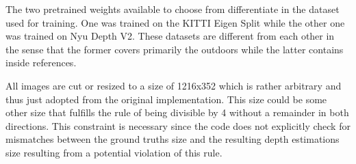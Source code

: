 The two pretrained weights available to choose from differentiate in the dataset used for training. One was trained on the KITTI Eigen Split while the other one was trained on Nyu Depth V2. These datasets are different from each other in the sense that the former covers primarily the outdoors while the latter contains inside references.

All images are cut or resized to a size of 1216x352 which is rather arbitrary and thus just adopted from the original implementation. This size could be some other size that fulfills the rule of being divisible by 4 without a remainder in both directions. This constraint is necessary since the code does not explicitly check for mismatches between the ground truths size and the resulting depth estimations size resulting from a potential violation of this rule.